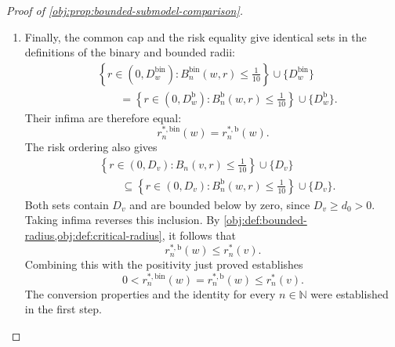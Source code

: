 \begin{proof}[Proof of \cref{obj:prop:bounded-submodel-comparison}]
\begin{enumerate}
\item Finally, the common cap and the risk equality give identical sets in the definitions of the binary and bounded radii:
\[
\begin{split}
&\left\{r\in(0,D_w^{\mathrm{bin}}):
 B_n^{\mathrm{bin}}(w,r)\le\frac1{10}\right\}
 \cup\{D_w^{\mathrm{bin}}\}\\
&\qquad=
\left\{r\in(0,D_w^{\mathrm b}):
 B_n^{\mathrm b}(w,r)\le\frac1{10}\right\}
 \cup\{D_w^{\mathrm b}\}.
\end{split}
\]
Their infima are therefore equal:
\[
r_n^{*,\mathrm{bin}}(w)=r_n^{*,\mathrm b}(w).
\]
The risk ordering also gives
\[
\begin{split}
&\left\{r\in(0,D_v):B_n(v,r)\le\frac1{10}\right\}\cup\{D_v\}\\
&\qquad\subseteq
\left\{r\in(0,D_v):B_n^{\mathrm b}(w,r)\le\frac1{10}\right\}
\cup\{D_v\}.
\end{split}
\]
Both sets contain \(D_v\) and are bounded below by zero, since \(D_v\ge d_0>0\). Taking infima reverses this inclusion. By
\cref{obj:def:bounded-radius,obj:def:critical-radius}, it follows that
\[
r_n^{*,\mathrm b}(w)\le r_n^*(v).
\]
Combining this with the positivity just proved establishes
\[
0<r_n^{*,\mathrm{bin}}(w)
=r_n^{*,\mathrm b}(w)\le r_n^*(v).
\]
The conversion properties and the identity for every \(n\in\mathbb N\) were established in the first step.
\end{enumerate}
\end{proof}

